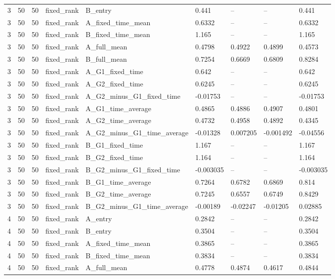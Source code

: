 \begin{longtable}{lllllllll}
3 & 50 & 50 & fixed\_rank & B\_entry & 0.441 & -- & -- & 0.441 \\
3 & 50 & 50 & fixed\_rank & A\_fixed\_time\_mean & 0.6332 & -- & -- & 0.6332 \\
3 & 50 & 50 & fixed\_rank & B\_fixed\_time\_mean & 1.165 & -- & -- & 1.165 \\
3 & 50 & 50 & fixed\_rank & A\_full\_mean & 0.4798 & 0.4922 & 0.4899 & 0.4573 \\
3 & 50 & 50 & fixed\_rank & B\_full\_mean & 0.7254 & 0.6669 & 0.6809 & 0.8284 \\
3 & 50 & 50 & fixed\_rank & A\_G1\_fixed\_time & 0.642 & -- & -- & 0.642 \\
3 & 50 & 50 & fixed\_rank & A\_G2\_fixed\_time & 0.6245 & -- & -- & 0.6245 \\
3 & 50 & 50 & fixed\_rank & A\_G2\_minus\_G1\_fixed\_time & -0.01753 & -- & -- & -0.01753 \\
3 & 50 & 50 & fixed\_rank & A\_G1\_time\_average & 0.4865 & 0.4886 & 0.4907 & 0.4801 \\
3 & 50 & 50 & fixed\_rank & A\_G2\_time\_average & 0.4732 & 0.4958 & 0.4892 & 0.4345 \\
3 & 50 & 50 & fixed\_rank & A\_G2\_minus\_G1\_time\_average & -0.01328 & 0.007205 & -0.001492 & -0.04556 \\
3 & 50 & 50 & fixed\_rank & B\_G1\_fixed\_time & 1.167 & -- & -- & 1.167 \\
3 & 50 & 50 & fixed\_rank & B\_G2\_fixed\_time & 1.164 & -- & -- & 1.164 \\
3 & 50 & 50 & fixed\_rank & B\_G2\_minus\_G1\_fixed\_time & -0.003035 & -- & -- & -0.003035 \\
3 & 50 & 50 & fixed\_rank & B\_G1\_time\_average & 0.7264 & 0.6782 & 0.6869 & 0.814 \\
3 & 50 & 50 & fixed\_rank & B\_G2\_time\_average & 0.7245 & 0.6557 & 0.6749 & 0.8429 \\
3 & 50 & 50 & fixed\_rank & B\_G2\_minus\_G1\_time\_average & -0.00189 & -0.02247 & -0.01205 & 0.02885 \\
4 & 50 & 50 & fixed\_rank & A\_entry & 0.2842 & -- & -- & 0.2842 \\
4 & 50 & 50 & fixed\_rank & B\_entry & 0.3504 & -- & -- & 0.3504 \\
4 & 50 & 50 & fixed\_rank & A\_fixed\_time\_mean & 0.3865 & -- & -- & 0.3865 \\
4 & 50 & 50 & fixed\_rank & B\_fixed\_time\_mean & 0.3834 & -- & -- & 0.3834 \\
4 & 50 & 50 & fixed\_rank & A\_full\_mean & 0.4778 & 0.4874 & 0.4617 & 0.4844 \\

\end{longtable}
